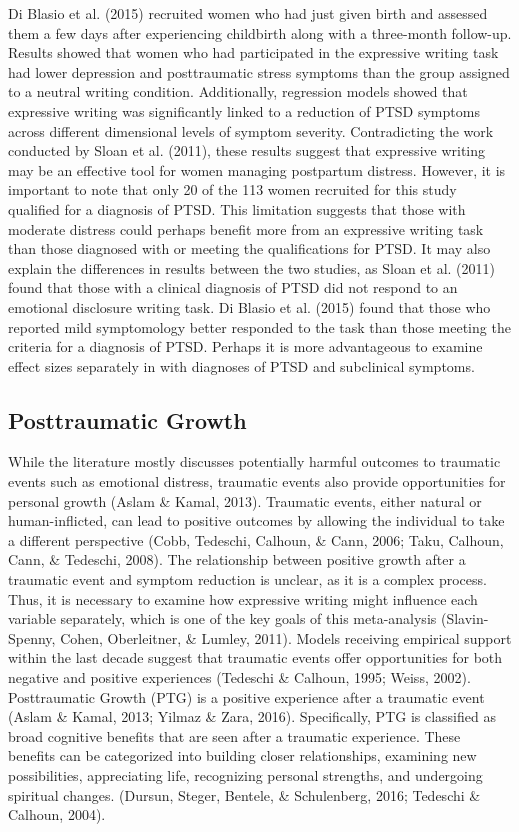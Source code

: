 \documentclass[english,man, mask]{apa6}
\theoremstyle{definition}
\theoremstyle{definition}
\theoremstyle{definition}
\theoremstyle{remark}
\begin{document}
Di Blasio et al. (2015) recruited women who had just given birth and
assessed them a few days after experiencing childbirth along with a
three-month follow-up. Results showed that women who had participated in
the expressive writing task had lower depression and posttraumatic
stress symptoms than the group assigned to a neutral writing condition.
Additionally, regression models showed that expressive writing was
significantly linked to a reduction of PTSD symptoms across different
dimensional levels of symptom severity. Contradicting the work conducted
by Sloan et al. (2011), these results suggest that expressive writing
may be an effective tool for women managing postpartum distress.
However, it is important to note that only 20 of the 113 women recruited
for this study qualified for a diagnosis of PTSD. This limitation
suggests that those with moderate distress could perhaps benefit more
from an expressive writing task than those diagnosed with or meeting the
qualifications for PTSD. It may also explain the differences in results
between the two studies, as Sloan et al. (2011) found that those with a
clinical diagnosis of PTSD did not respond to an emotional disclosure
writing task. Di Blasio et al. (2015) found that those who reported mild
symptomology better responded to the task than those meeting the
criteria for a diagnosis of PTSD. Perhaps it is more advantageous to
examine effect sizes separately in with diagnoses of PTSD and
subclinical symptoms.

\subsection{Posttraumatic Growth}\label{posttraumatic-growth}

While the literature mostly discusses potentially harmful outcomes to
traumatic events such as emotional distress, traumatic events also
provide opportunities for personal growth (Aslam \& Kamal, 2013).
Traumatic events, either natural or human-inflicted, can lead to
positive outcomes by allowing the individual to take a different
perspective (Cobb, Tedeschi, Calhoun, \& Cann, 2006; Taku, Calhoun,
Cann, \& Tedeschi, 2008). The relationship between positive growth after
a traumatic event and symptom reduction is unclear, as it is a complex
process. Thus, it is necessary to examine how expressive writing might
influence each variable separately, which is one of the key goals of
this meta-analysis (Slavin-Spenny, Cohen, Oberleitner, \& Lumley, 2011).
Models receiving empirical support within the last decade suggest that
traumatic events offer opportunities for both negative and positive
experiences (Tedeschi \& Calhoun, 1995; Weiss, 2002). Posttraumatic
Growth (PTG) is a positive experience after a traumatic event (Aslam \&
Kamal, 2013; Yilmaz \& Zara, 2016). Specifically, PTG is classified as
broad cognitive benefits that are seen after a traumatic experience.
These benefits can be categorized into building closer relationships,
examining new possibilities, appreciating life, recognizing personal
strengths, and undergoing spiritual changes. (Dursun, Steger, Bentele,
\& Schulenberg, 2016; Tedeschi \& Calhoun, 2004).
\end{document}

